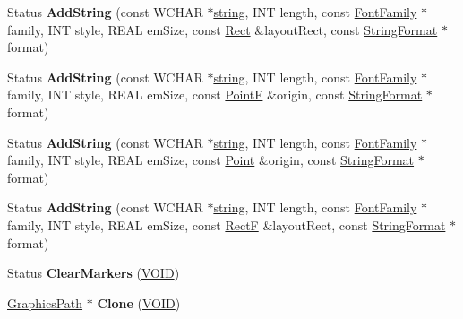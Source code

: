 \begin{DoxyCompactItemize}
\mbox{\label{class_graphics_path_addcad4ee56226be63188644a35b1ef50}} 
Status {\bfseries Add\+String} (const W\+C\+H\+AR $\ast$\hyperlink{structstring}{string}, I\+NT length, const \hyperlink{class_font_family}{Font\+Family} $\ast$family, I\+NT style, R\+E\+AL em\+Size, const \hyperlink{struct_rect}{Rect} \&layout\+Rect, const \hyperlink{class_string_format}{String\+Format} $\ast$format)
\item 
\mbox{\label{class_graphics_path_a11cf6dc366609caac2003e27e4a72959}} 
Status {\bfseries Add\+String} (const W\+C\+H\+AR $\ast$\hyperlink{structstring}{string}, I\+NT length, const \hyperlink{class_font_family}{Font\+Family} $\ast$family, I\+NT style, R\+E\+AL em\+Size, const \hyperlink{struct_point_f}{PointF} \&origin, const \hyperlink{class_string_format}{String\+Format} $\ast$format)
\item 
\mbox{\label{class_graphics_path_a20279e9c0352d6edbe97d42d48aba77b}} 
Status {\bfseries Add\+String} (const W\+C\+H\+AR $\ast$\hyperlink{structstring}{string}, I\+NT length, const \hyperlink{class_font_family}{Font\+Family} $\ast$family, I\+NT style, R\+E\+AL em\+Size, const \hyperlink{struct_point}{Point} \&origin, const \hyperlink{class_string_format}{String\+Format} $\ast$format)
\item 
\mbox{\label{class_graphics_path_af7598a180d105dcc95b48aa2dbfe53a2}} 
Status {\bfseries Add\+String} (const W\+C\+H\+AR $\ast$\hyperlink{structstring}{string}, I\+NT length, const \hyperlink{class_font_family}{Font\+Family} $\ast$family, I\+NT style, R\+E\+AL em\+Size, const \hyperlink{struct_rect_f}{RectF} \&layout\+Rect, const \hyperlink{class_string_format}{String\+Format} $\ast$format)
\item 
\mbox{\label{class_graphics_path_a9ab0cac9a8cad9ef5560ce771128e6f9}} 
Status {\bfseries Clear\+Markers} (\hyperlink{interfacevoid}{V\+O\+ID})
\item 
\mbox{\label{class_graphics_path_a46ea5ad38c07d8760eff894f0586cb13}} 
\hyperlink{class_graphics_path}{Graphics\+Path} $\ast$ {\bfseries Clone} (\hyperlink{interfacevoid}{V\+O\+ID})
\item 
\mbox{\label{class_graphics_path_a2ddf1b3f405908f2a5a6bb2b42fa7672}} 

\end{DoxyCompactItemize}
